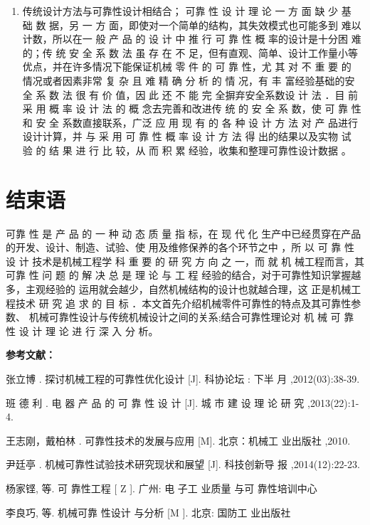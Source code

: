 \documentclass[a4paper,12pt]{article}
\begin{document}
\begin{enumerate}
	\item  传统设计方法与可靠性设计相结合；
	可靠 性 设 计 理 论 一 方 面 缺 少 基 础 数 据，另 一 方 面，即使对一个简单的结构，其失效模式也可能多到 难以计数，所以在一 般 产 品 的 设 计 中 推 行 可 靠 性 概 率的设计是十分困 难 的；传 统 安 全 系 数 法 虽 存 在 不 足，但有直观、简单、设计工作量小等优点，并在许多情况下能保证机械 零 件 的 可 靠 性，尤 其 对 不 重 要 的 情况或者因素非常 复 杂 且 难 精 确 分 析 的 情 况，有 丰 富经验基础的安全 系 数 法 很 有 价 值，因 此 还 不 能 完 全摒弃安全系数设 计 法 ．目 前 采 用 概 率 设 计 法 的 概 念去完善和改进传 统 的 安 全 系 数，使 可 靠 性 和 安 全 系数直接联系，广泛 应 用 现 有 的 各 种 设 计 方 法 对 产 品进行设计计算，并 与 采 用 可 靠 性 概 率 设 计 方 法 得 出的结果以及实物 试 验 的 结 果 进 行 比 较，从 而 积 累 经验，收集和整理可靠性设计数据 。
\end{enumerate}

\section{结束语}

可靠 性 是 产 品 的 一 种 动 态 质 量 指 标，在 现 代 化 生产中已经贯穿在产品的开发、设计、制造、试验、使 用及维修保养的各个环节之中 ，所 以 可 靠 性 设 计 技术是机械工程学 科 重 要 的 研 究 方 向 之 一，而 就 机 械工程而言，其可靠 性 问 题 的 解 决 总 是 理 论 与 工 程 经验的结合，对于可靠性知识掌握越多，主观经验的 运用就会越少，自然机械结构的设计也就越合理，这 正是机械工程技术 研 究 追 求 的 目 标 ．本文首先介绍机械零件可靠性的特点及其可靠性参数、 机械可靠性设计与传统机械设计之间的关系;结合可靠性理论对 机 械 可 靠 性 设 计 理 论 进 行 深 入 分 析。

\vspace{2em}
{ \noindent \sanhao \bf 参考文献：}
\begin{enumerate}[{[1]}]
	\item 张立博 . 探讨机械工程的可靠性优化设计 [J]. 科协论坛 : 下半 月 ,2012(03):38-39. 
	\item 班 德 利 . 电 器 产 品 的 可 靠 性 设 计 [J]. 城 市 建 设 理 论 研 究 ,2013(22):1-4. 
	\item 王志刚，戴柏林 . 可靠性技术的发展与应用 [M]. 北京：机械工 业出版社 ,2010.
	\item 尹廷亭 . 机械可靠性试验技术研究现状和展望 [J]. 科技创新导 报 ,2014(12):22-23.
	\item 杨家铿, 等. 可 靠性工程 [ Z ]. 广州: 电 子工 业质量 与可 靠性培训中心
	\item 李良巧, 等. 机械可靠 性设计 与分析 [M ]. 北京: 国防工 业出版社
\end{enumerate}

%
%
%
%
%
%
%
\end{document}
